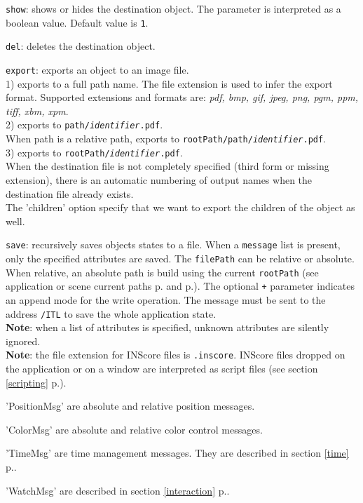 \documentclass[a4paper,twoside]{report}
\newcommand{\fullref}[1]	{\ref{#1} p.\pageref{#1}}
\newcommand{\OSC}[1]		{\texttt{#1}}
\newcommand{\values}[1]		{\texttt{#1}}
\let\olditemize\itemize
\let\oldenditemize\enditemize
\renewenvironment{itemize} 	{\olditemize \setlength{\itemsep}{1mm}}{\oldenditemize}
\begin{document}
\begin{itemize}
\item \OSC{show}: shows or hides the destination object. The parameter is interpreted as a boolean value. Default value is \values{1}. 
\item \OSC{del}: deletes the destination object. 

\item \OSC{export}: exports an object to an image file. \\
1) exports to a full path name. The file extension is used to infer the export format. Supported extensions and formats are: \emph{pdf, bmp, gif, jpeg, png, pgm, ppm, tiff, xbm, xpm}. \\
2) exports to \OSC{path/\textit{identifier}.pdf}. \\
When path is a relative path, exports to \OSC{rootPath/path/\textit{identifier}.pdf}. \\
3) exports to \OSC{rootPath/\textit{identifier}.pdf}.\\
When the destination file is not completely specified (third form or missing extension), there is an automatic numbering of output names when the destination file already exists. \\ 
The 'children' option specify that we want to export the children of the object as well.

\item \OSC{save}: recursively saves objects states to a file. When a \OSC{message} list is present, only the specified attributes are saved. The \OSC{filePath} can be relative or absolute. When relative, an absolute path is build using the current \OSC{rootPath} (see application or scene current paths  p.\pageref{applmgmt} and  p.\pageref{scene}). The optional \OSC{+} parameter indicates an append mode for the write operation. The message must be sent to the address \OSC{/ITL} to save the whole application state.\\
\textbf{Note}: when a list of attributes is specified, unknown attributes are silently ignored. \\
\textbf{Note}: the file extension for INScore files is \OSC{.inscore}. INScore files dropped on the application or on a window are interpreted as script files (see section \fullref{scripting}).

\item 'PositionMsg' are absolute and relative position messages.
\item 'ColorMsg' are absolute and relative color control messages.
\item 'TimeMsg' are time management messages. They are described in section \fullref{time}.
\item 'WatchMsg' are described in section \fullref{interaction}.
\end{itemize}
\end{document}
